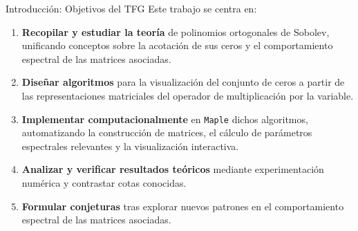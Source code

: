 \begin{frame}{Introducción: Objetivos del TFG} %
	\footnotesize %
	Este trabajo se centra en:
	\begin{enumerate}
		\item \textbf{Recopilar y estudiar la teoría} de polinomios ortogonales de Sobolev, unificando conceptos sobre la acotación de sus ceros y el comportamiento espectral de las matrices asociadas.
		      \pause
		\item \textbf{Diseñar algoritmos} para la visualización del conjunto de ceros a partir de las representaciones matriciales del operador de multiplicación por la variable.
		      \pause
		\item \textbf{Implementar computacionalmente} en \texttt{Maple} dichos algoritmos, automatizando la construcción de matrices, el cálculo de parámetros espectrales relevantes y la visualización interactiva.
		      \pause
		\item \textbf{Analizar y verificar resultados teóricos} mediante experimentación numérica y contrastar cotas conocidas.
		      \pause
		\item  \textbf{Formular conjeturas} tras explorar nuevos patrones en el comportamiento espectral de las matrices asociadas.
	\end{enumerate}
\end{frame}